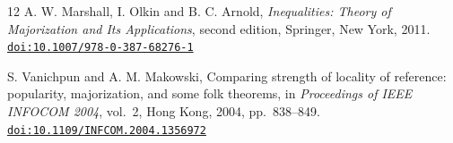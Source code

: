 \documentclass[11pt]{article}
\theoremstyle{remark}
\newcommand{\doi}[1]{\href{https://doi.org/#1}{\nolinkurl{doi:#1}}}
\begin{document}
\begin{thebibliography}{12}
A. W. Marshall, I. Olkin and B. C. Arnold,
\emph{Inequalities: Theory of Majorization and Its Applications}, second edition,
Springer, New York, 2011.
\doi{10.1007/978-0-387-68276-1}

S. Vanichpun and A. M. Makowski,
Comparing strength of locality of reference: popularity, majorization, and some folk theorems,
in \emph{Proceedings of IEEE INFOCOM 2004}, vol.~2, Hong Kong, 2004, pp.~838--849.
\doi{10.1109/INFCOM.2004.1356972}

\end{thebibliography}
\end{document}
